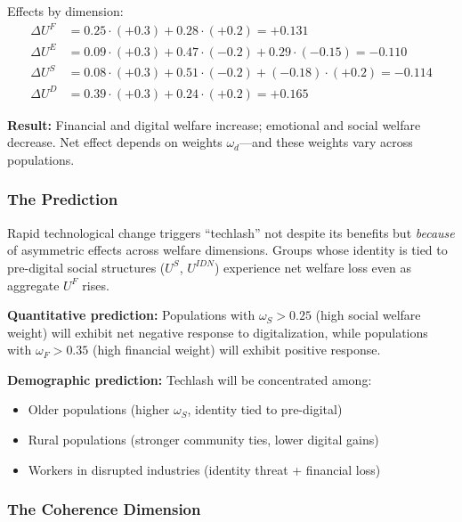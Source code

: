 Effects by dimension:
\begin{align*}
\Delta U^F &= 0.25 \cdot (+0.3) + 0.28 \cdot (+0.2) = +0.131 \\
\Delta U^E &= 0.09 \cdot (+0.3) + 0.47 \cdot (-0.2) + 0.29 \cdot (-0.15) = -0.110 \\
\Delta U^S &= 0.08 \cdot (+0.3) + 0.51 \cdot (-0.2) + (-0.18) \cdot (+0.2) = -0.114 \\
\Delta U^D &= 0.39 \cdot (+0.3) + 0.24 \cdot (+0.2) = +0.165
\end{align*}

\textbf{Result:} Financial and digital welfare increase; emotional and social welfare decrease.
Net effect depends on weights $\omega_d$---and these weights vary across populations.

\subsubsection{The Prediction}

\begin{tcolorbox}[colback=blue!5!white, colframe=blue!75!black, title=Prediction 4: Techlash as Coherence Response]
Rapid technological change triggers ``techlash'' not despite its benefits 
but \emph{because} of asymmetric effects across welfare dimensions. Groups 
whose identity is tied to pre-digital social structures ($U^S$, $U^{IDN}$) 
experience net welfare loss even as aggregate $U^F$ rises.

\textbf{Quantitative prediction:} Populations with $\omega_S > 0.25$ 
(high social welfare weight) will exhibit net negative response to 
digitalization, while populations with $\omega_F > 0.35$ (high financial 
weight) will exhibit positive response.

\textbf{Demographic prediction:} Techlash will be concentrated among:
\begin{itemize}
  \item Older populations (higher $\omega_S$, identity tied to pre-digital)
  \item Rural populations (stronger community ties, lower digital gains)
  \item Workers in disrupted industries (identity threat + financial loss)
\end{itemize}
\end{tcolorbox}

\subsubsection{The Coherence Dimension}

